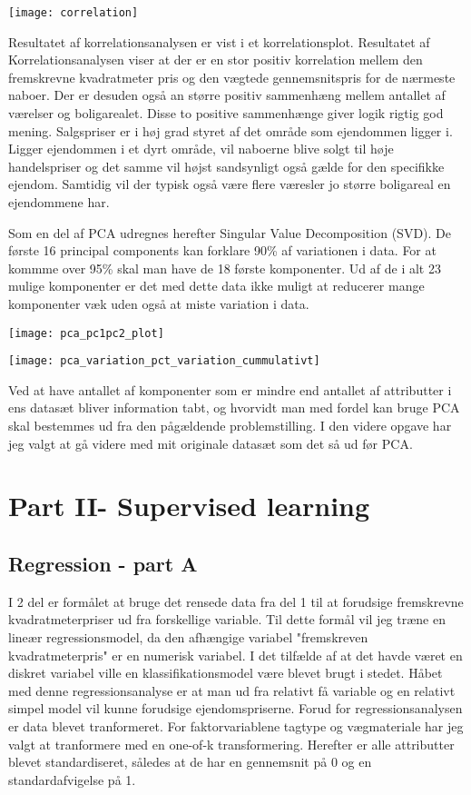 \documentclass{report}
\begin{document}
\texttt{[image: correlation]}

Resultatet af korrelationsanalysen er vist i et korrelationsplot. Resultatet af 
Korrelationsanalysen viser at der er en stor positiv korrelation mellem den fremskrevne
kvadratmeter pris og den vægtede gennemsnitspris for de nærmeste naboer. Der er desuden også 
an større positiv sammenhæng mellem antallet af værelser og boligarealet. 
Disse to positive sammenhænge giver logik rigtig god mening. Salgspriser er i høj grad styret af
det område som ejendommen ligger i. Ligger ejendommen i et dyrt område, vil naboerne blive solgt
til høje handelspriser og det samme vil højst sandsynligt også gælde for den specifikke ejendom. 
Samtidig vil der typisk også være flere væresler jo større boligareal en ejendommene har. 

Som en del af PCA udregnes herefter Singular Value Decomposition (SVD).
De første 16 principal components kan forklare 90\% af variationen i data. For at kommme over 95\%
skal man have de 18 første komponenter. Ud af de i alt 23 mulige komponenter er det med dette data
ikke muligt at reducerer mange komponenter væk uden også at miste variation i data. 

\texttt{[image: pca\_pc1pc2\_plot]}


\texttt{[image: pca\_variation\_pct\_variation\_cummulativt]}

Ved at have antallet af komponenter som er mindre end antallet af attributter i ens datasæt bliver
information tabt, og hvorvidt man med fordel kan bruge PCA skal bestemmes ud fra den pågældende
problemstilling. I den videre opgave har jeg valgt at gå videre med mit originale datasæt som det
så ud før PCA. 

\chapter{Part II- Supervised learning}

\section{Regression - part A}
I 2 del er formålet at bruge det rensede data fra del 1 til at forudsige fremskrevne 
kvadratmeterpriser ud fra forskellige variable. Til dette formål vil jeg træne en lineær 
regressionsmodel, da den afhængige variabel "fremskreven kvadratmeterpris" er en numerisk variabel.
I det tilfælde af at det havde været en diskret variabel ville en klassifikationsmodel være blevet
brugt i stedet.
Håbet med denne regressionsanalyse er at man ud fra relativt få variable og en relativt simpel
model vil kunne forudsige ejendomspriserne. 
Forud for regressionsanalysen er data blevet tranformeret. For faktorvariablene tagtype og
vægmateriale har jeg valgt at tranformere med en one-of-k transformering. Herefter er alle
attributter blevet standardiseret, således at de har en gennemsnit på 0 og en standardafvigelse på
1. 
\end{document}

